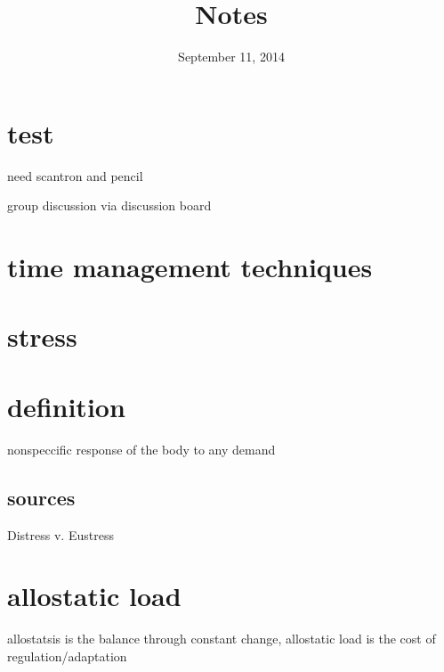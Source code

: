 \documentclass[letterpaper]{article}
\begin{document}
\title{Notes}
\date{September 11, 2014}
\maketitle
\section*{test}
need scantron and pencil

group discussion via discussion board

\section*{time management techniques}

\section*{stress}
\section*{definition}
nonspeccific response of the body to any demand
\subsection*{sources}
Distress v. Eustress


\section*{allostatic load}
allostatsis is the balance through constant change, allostatic load is the cost of regulation/adaptation
\end{document}
